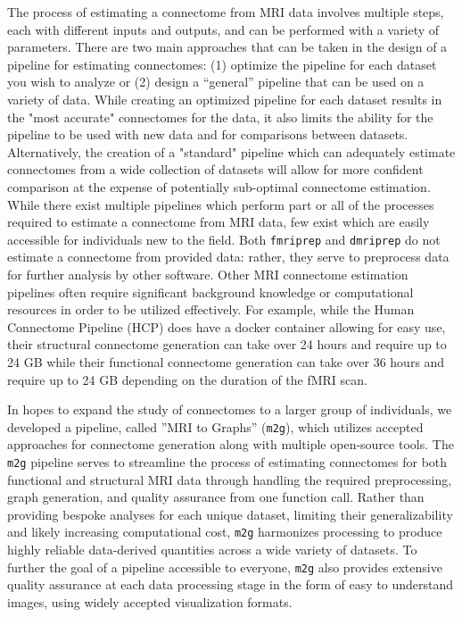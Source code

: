 The process of estimating a connectome from MRI data involves multiple steps, each with different inputs and outputs, and can be performed with a variety of parameters. There are two main approaches that can be taken in the design of a pipeline for estimating connectomes: (1) optimize the pipeline for each dataset you wish to analyze or (2) design a ``general'' pipeline that can be used on a variety of data. While creating an optimized pipeline for each dataset results in the "most accurate" connectomes for the data, it also limits the ability for the pipeline to be used with new data and for comparisons between datasets. Alternatively, the creation of a "standard" pipeline which can adequately estimate connectomes from a wide collection of datasets will allow for more confident comparison at the expense of potentially sub-optimal connectome estimation.  While there exist multiple pipelines which perform part or all of the processes required to estimate a connectome from MRI data, few exist which are easily accessible for individuals new to the field. Both \texttt{fmriprep} \cite{fmriprep} and \texttt{dmriprep} \cite{dmriprep} do not estimate a connectome from provided data: rather, they serve to preprocess data for further analysis by other software. Other MRI connectome estimation pipelines often require significant background knowledge or computational resources in order to be utilized effectively. For example, while the Human Connectome Pipeline (HCP) \cite{hcp} does have a docker container allowing for easy use, their structural connectome generation can take over 24 hours and require up to 24 GB while their functional connectome generation can take over 36 hours and require up to 24 GB depending on the duration of the fMRI scan.

In hopes to expand the study of connectomes to a larger group of individuals, we developed a pipeline, called ''MRI to Graphs'' (\texttt{m2g}), which utilizes accepted approaches for connectome generation along with multiple open-source tools. The \texttt{m2g} pipeline serves to streamline the process of estimating connectomes for both functional and structural MRI data through handling the required preprocessing, graph generation, and quality assurance from one function call. Rather than providing bespoke analyses for each unique dataset, limiting their generalizability and likely increasing computational cost, \texttt{m2g} harmonizes processing to produce highly reliable data-derived quantities across a wide variety of datasets. To further the goal of a pipeline accessible to everyone, \texttt{m2g} also provides extensive quality assurance at each data processing stage in the form of easy to understand images, using widely accepted visualization formats.

